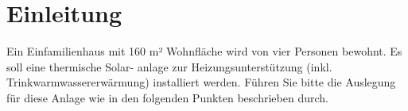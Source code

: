 \section{Einleitung}
\label{sec:Einleitung}
Ein Einfamilienhaus mit 160 m² Wohnfläche wird von vier Personen bewohnt. Es soll eine thermische Solar-
anlage zur Heizungsunterstützung (inkl. Trinkwarmwassererwärmung) installiert werden. Führen Sie bitte
die Auslegung für diese Anlage wie in den folgenden Punkten beschrieben durch.